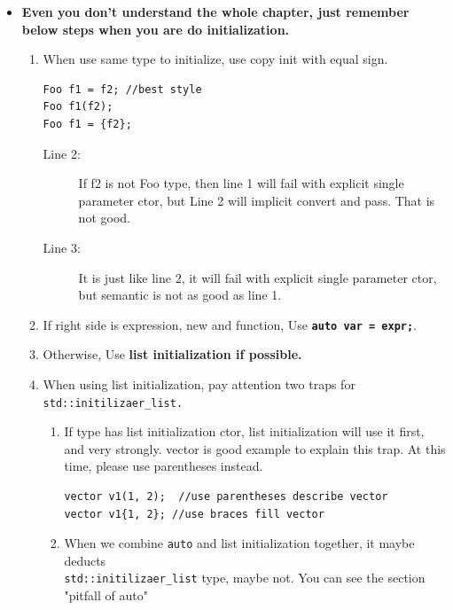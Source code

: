 \documentclass[a4paper,11pt,twoside]{book}
\begin{document}
\begin{itemize}
	\item \textbf{Even you don't understand the whole chapter, just remember below steps when you are do initialization.}
	\begin{enumerate}
		\item When use same type to initialize, use copy init with equal sign.
\begin{lstlisting}
Foo f1 = f2; //best style
Foo f1(f2);  
Foo f1 = {f2}; 
\end{lstlisting}
\begin{description}
	\item[Line 2:] If f2 is not Foo type, then line 1 will fail with explicit single parameter ctor, but Line 2 will implicit convert and pass. That is not good.
	
	\item[Line 3:] It is just like line 2, it will fail with explicit single parameter ctor, but semantic is not as good as line 1.
\end{description}
		\item If right side is expression, new and function, Use \textbf{\texttt{auto var = expr;}}. 
		
		\item Otherwise, Use \textbf{list initialization if possible.} 
		
		\item When using list initialization, pay attention two traps for \texttt{std::initilizaer\_list.} 
		\begin{enumerate}
			\item If type has list initialization ctor, list initialization will use it first, and very strongly. vector is good example to explain this trap. At this time, please use parentheses instead.
\begin{lstlisting}
vector v1(1, 2);  //use parentheses describe vector 
vector v1{1, 2}; //use braces fill vector
\end{lstlisting}
			
			\item When we combine \texttt{auto} and list initialization together, it maybe deducts \\ \texttt{std::initilizaer\_list} type, maybe not.  You can see the section "pitfall of auto" 
		\end{enumerate}
	\end{enumerate}
	
\end{itemize}
\end{document}
